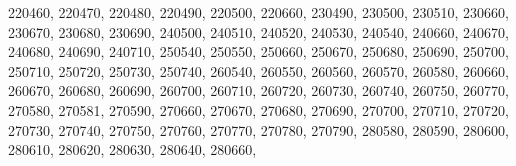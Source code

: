 \textquotesingle{}220460\textquotesingle{}, \textquotesingle{}220470\textquotesingle{}, \textquotesingle{}220480\textquotesingle{}, \textquotesingle{}220490\textquotesingle{}, \textquotesingle{}220500\textquotesingle{}, \textquotesingle{}220660\textquotesingle{}, \textquotesingle{}230490\textquotesingle{}, \textquotesingle{}230500\textquotesingle{}, \textquotesingle{}230510\textquotesingle{}, \textquotesingle{}230660\textquotesingle{}, \textquotesingle{}230670\textquotesingle{}, \textquotesingle{}230680\textquotesingle{}, \textquotesingle{}230690\textquotesingle{}, \textquotesingle{}240500\textquotesingle{}, \textquotesingle{}240510\textquotesingle{}, \textquotesingle{}240520\textquotesingle{}, \textquotesingle{}240530\textquotesingle{}, \textquotesingle{}240540\textquotesingle{}, \textquotesingle{}240660\textquotesingle{}, \textquotesingle{}240670\textquotesingle{}, \textquotesingle{}240680\textquotesingle{}, \textquotesingle{}240690\textquotesingle{}, \textquotesingle{}240710\textquotesingle{}, \textquotesingle{}250540\textquotesingle{}, \textquotesingle{}250550\textquotesingle{}, \textquotesingle{}250660\textquotesingle{}, \textquotesingle{}250670\textquotesingle{}, \textquotesingle{}250680\textquotesingle{}, \textquotesingle{}250690\textquotesingle{}, \textquotesingle{}250700\textquotesingle{}, \textquotesingle{}250710\textquotesingle{}, \textquotesingle{}250720\textquotesingle{}, \textquotesingle{}250730\textquotesingle{}, \textquotesingle{}250740\textquotesingle{}, \textquotesingle{}260540\textquotesingle{}, \textquotesingle{}260550\textquotesingle{}, \textquotesingle{}260560\textquotesingle{}, \textquotesingle{}260570\textquotesingle{}, \textquotesingle{}260580\textquotesingle{}, \textquotesingle{}260660\textquotesingle{}, \textquotesingle{}260670\textquotesingle{}, \textquotesingle{}260680\textquotesingle{}, \textquotesingle{}260690\textquotesingle{}, \textquotesingle{}260700\textquotesingle{}, \textquotesingle{}260710\textquotesingle{}, \textquotesingle{}260720\textquotesingle{}, \textquotesingle{}260730\textquotesingle{}, \textquotesingle{}260740\textquotesingle{}, \textquotesingle{}260750\textquotesingle{}, \textquotesingle{}260770\textquotesingle{}, \textquotesingle{}270580\textquotesingle{}, \textquotesingle{}270581\textquotesingle{}, \textquotesingle{}270590\textquotesingle{}, \textquotesingle{}270660\textquotesingle{}, \textquotesingle{}270670\textquotesingle{}, \textquotesingle{}270680\textquotesingle{}, \textquotesingle{}270690\textquotesingle{}, \textquotesingle{}270700\textquotesingle{}, \textquotesingle{}270710\textquotesingle{}, \textquotesingle{}270720\textquotesingle{}, \textquotesingle{}270730\textquotesingle{}, \textquotesingle{}270740\textquotesingle{}, \textquotesingle{}270750\textquotesingle{}, \textquotesingle{}270760\textquotesingle{}, \textquotesingle{}270770\textquotesingle{}, \textquotesingle{}270780\textquotesingle{}, \textquotesingle{}270790\textquotesingle{}, \textquotesingle{}280580\textquotesingle{}, \textquotesingle{}280590\textquotesingle{}, \textquotesingle{}280600\textquotesingle{}, \textquotesingle{}280610\textquotesingle{}, \textquotesingle{}280620\textquotesingle{}, \textquotesingle{}280630\textquotesingle{}, \textquotesingle{}280640\textquotesingle{}, \textquotesingle{}280660\textquotesingle{}, 